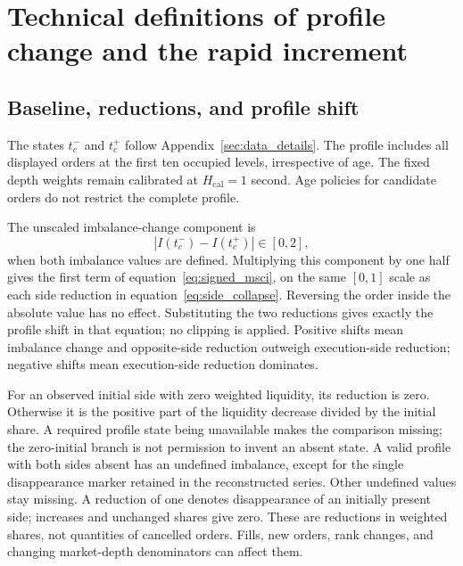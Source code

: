 \section{Technical definitions of profile change and the rapid increment}
\label{sec:profile_technical}
\subsection{Baseline, reductions, and profile shift}
The states $t_c^-$ and $t_c^+$ follow Appendix~\ref{sec:data_details}. The profile includes all displayed orders at the first ten occupied levels, irrespective of age. The fixed depth weights remain calibrated at $H_{\mathrm{cal}}=1$ second. Age policies for candidate orders do not restrict the complete profile.

The unscaled imbalance-change component is
\begin{equation}
    \left|I(t_c^-)-I(t_c^+)\right|\in[0,2],
    \label{eq:topn_sci}
\end{equation}
when both imbalance values are defined. Multiplying this component by one half gives the first term of equation~\eqref{eq:signed_msci}, on the same $[0,1]$ scale as each side reduction in equation~\eqref{eq:side_collapse}. Reversing the order inside the absolute value has no effect. Substituting the two reductions gives exactly the profile shift in that equation; no clipping is applied. Positive shifts mean imbalance change and opposite-side reduction outweigh execution-side reduction; negative shifts mean execution-side reduction dominates.

For an observed initial side with zero weighted liquidity, its reduction is zero. Otherwise it is the positive part of the liquidity decrease divided by the initial share. A required profile state being unavailable makes the comparison missing; the zero-initial branch is not permission to invent an absent state. A valid profile with both sides absent has an undefined imbalance, except for the single disappearance marker retained in the reconstructed series. Other undefined values stay missing. A reduction of one denotes disappearance of an initially present side; increases and unchanged shares give zero. These are reductions in weighted shares, not quantities of cancelled orders. Fills, new orders, rank changes, and changing market-depth denominators can affect them.

